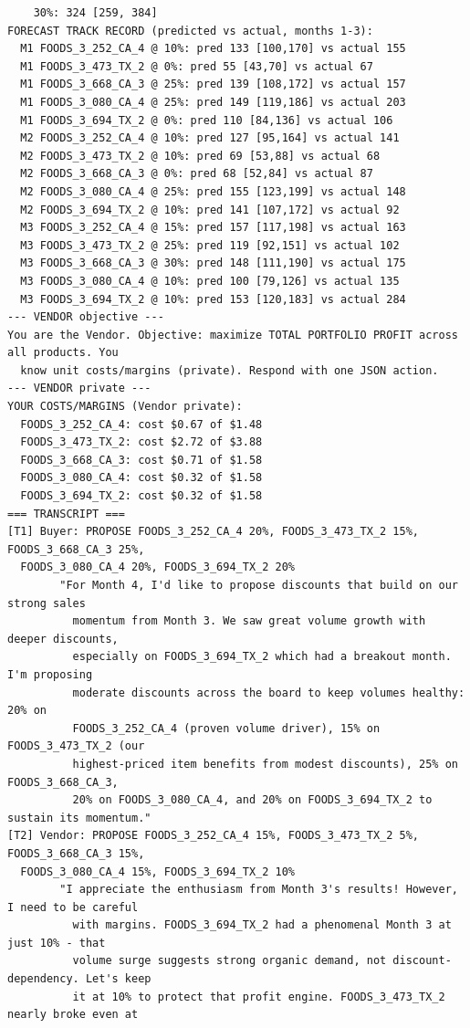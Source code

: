 {\begin{verbatim}
    30%: 324 [259, 384]
FORECAST TRACK RECORD (predicted vs actual, months 1-3):
  M1 FOODS_3_252_CA_4 @ 10%: pred 133 [100,170] vs actual 155
  M1 FOODS_3_473_TX_2 @ 0%: pred 55 [43,70] vs actual 67
  M1 FOODS_3_668_CA_3 @ 25%: pred 139 [108,172] vs actual 157
  M1 FOODS_3_080_CA_4 @ 25%: pred 149 [119,186] vs actual 203
  M1 FOODS_3_694_TX_2 @ 0%: pred 110 [84,136] vs actual 106
  M2 FOODS_3_252_CA_4 @ 10%: pred 127 [95,164] vs actual 141
  M2 FOODS_3_473_TX_2 @ 10%: pred 69 [53,88] vs actual 68
  M2 FOODS_3_668_CA_3 @ 0%: pred 68 [52,84] vs actual 87
  M2 FOODS_3_080_CA_4 @ 25%: pred 155 [123,199] vs actual 148
  M2 FOODS_3_694_TX_2 @ 10%: pred 141 [107,172] vs actual 92
  M3 FOODS_3_252_CA_4 @ 15%: pred 157 [117,198] vs actual 163
  M3 FOODS_3_473_TX_2 @ 25%: pred 119 [92,151] vs actual 102
  M3 FOODS_3_668_CA_3 @ 30%: pred 148 [111,190] vs actual 175
  M3 FOODS_3_080_CA_4 @ 10%: pred 100 [79,126] vs actual 135
  M3 FOODS_3_694_TX_2 @ 10%: pred 153 [120,183] vs actual 284
--- VENDOR objective ---
You are the Vendor. Objective: maximize TOTAL PORTFOLIO PROFIT across all products. You
  know unit costs/margins (private). Respond with one JSON action.
--- VENDOR private ---
YOUR COSTS/MARGINS (Vendor private):
  FOODS_3_252_CA_4: cost $0.67 of $1.48
  FOODS_3_473_TX_2: cost $2.72 of $3.88
  FOODS_3_668_CA_3: cost $0.71 of $1.58
  FOODS_3_080_CA_4: cost $0.32 of $1.58
  FOODS_3_694_TX_2: cost $0.32 of $1.58
=== TRANSCRIPT ===
[T1] Buyer: PROPOSE FOODS_3_252_CA_4 20%, FOODS_3_473_TX_2 15%, FOODS_3_668_CA_3 25%,
  FOODS_3_080_CA_4 20%, FOODS_3_694_TX_2 20%
        "For Month 4, I'd like to propose discounts that build on our strong sales
          momentum from Month 3. We saw great volume growth with deeper discounts,
          especially on FOODS_3_694_TX_2 which had a breakout month. I'm proposing
          moderate discounts across the board to keep volumes healthy: 20% on
          FOODS_3_252_CA_4 (proven volume driver), 15% on FOODS_3_473_TX_2 (our
          highest-priced item benefits from modest discounts), 25% on FOODS_3_668_CA_3,
          20% on FOODS_3_080_CA_4, and 20% on FOODS_3_694_TX_2 to sustain its momentum."
[T2] Vendor: PROPOSE FOODS_3_252_CA_4 15%, FOODS_3_473_TX_2 5%, FOODS_3_668_CA_3 15%,
  FOODS_3_080_CA_4 15%, FOODS_3_694_TX_2 10%
        "I appreciate the enthusiasm from Month 3's results! However, I need to be careful
          with margins. FOODS_3_694_TX_2 had a phenomenal Month 3 at just 10% - that
          volume surge suggests strong organic demand, not discount-dependency. Let's keep
          it at 10% to protect that profit engine. FOODS_3_473_TX_2 nearly broke even at

\end{verbatim}}
